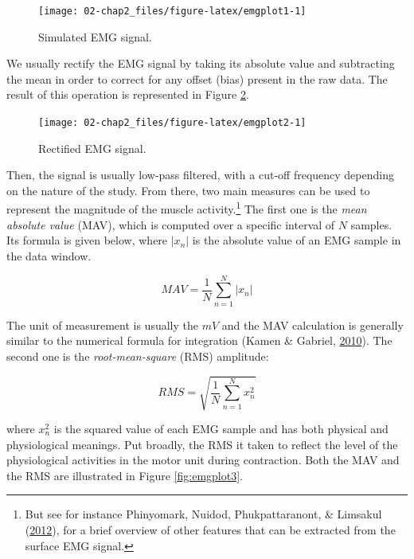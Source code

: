 \documentclass[a4paper,12pt,twoside,onecolumn,openright,final,oldfontcommands]{memoir}
\let\rmarkdownfootnote\footnote%
\def\footnote{\protect\rmarkdownfootnote}
\begin{document}
\begin{figure}[ht]

{\centering \texttt{[image: 02-chap2\_files/figure-latex/emgplot1-1]} 

}

\caption{Simulated EMG signal.}\label{fig:emgplot1}
\end{figure}

We usually rectify the EMG signal by taking its absolute value and subtracting the mean in order to correct for any offset (bias) present in the raw data. The result of this operation is represented in Figure \ref{fig:emgplot2}.

\begin{figure}[ht]

{\centering \texttt{[image: 02-chap2\_files/figure-latex/emgplot2-1]} 

}

\caption{Rectified EMG signal.}\label{fig:emgplot2}
\end{figure}

Then, the signal is usually low-pass filtered, with a cut-off frequency depending on the nature of the study. From there, two main measures can be used to represent the magnitude of the muscle activity.\footnote{But see for instance Phinyomark, Nuidod, Phukpattaranont, \& Limsakul (\protect\hyperlink{ref-phinyomark_feature_2012}{2012}), for a brief overview of other features that can be extracted from the surface EMG signal.} The first one is the \emph{mean absolute value} (MAV), which is computed over a specific interval of \(N\) samples. Its formula is given below, where \(|x_{n}|\) is the absolute value of an EMG sample in the data window.

\[MAV = \frac{1}{N} \sum_{n=1}^{N} | x_{n} |\]

The unit of measurement is usually the \(mV\) and the MAV calculation is generally similar to the numerical formula for integration (Kamen \& Gabriel, \protect\hyperlink{ref-kamen_essentials_2010}{2010}). The second one is the \emph{root-mean-square} (RMS) amplitude:

\[RMS = \sqrt{ \frac{1}{N} \sum_{n=1}^{N} x^{2}_{n} }\]

where \(x^{2}_{n}\) is the squared value of each EMG sample and has both physical and physiological meanings. Put broadly, the RMS it taken to reflect the level of the physiological activities in the motor unit during contraction. Both the MAV and the RMS are illustrated in Figure \ref{fig:emgplot3}.
\end{document}
